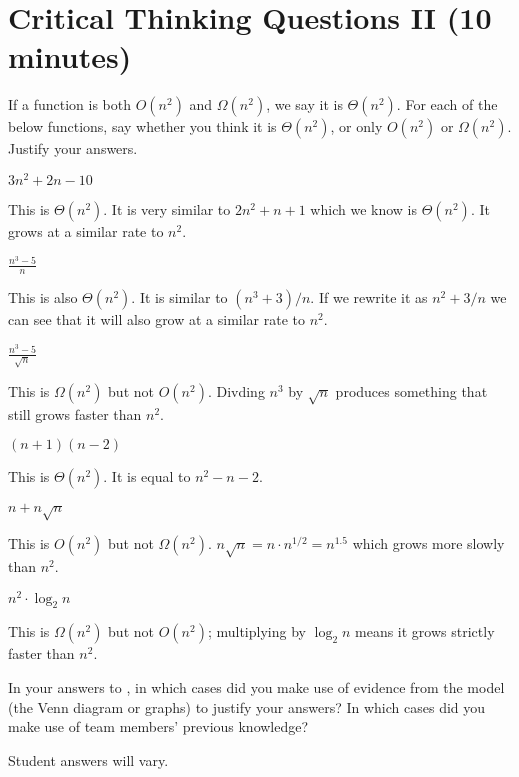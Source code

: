 \documentclass{tufte-handout}
\begin{document}
\section{Critical Thinking Questions II (10 minutes)}

\begin{questions}
\item \label{q:classify} If a function is both $O(n^2)$ and
  $\Omega(n^2)$, we say it is $\Theta(n^2)$.    For each of the below functions, say
  whether you think it is $\Theta(n^2)$, or only $O(n^2)$ or
  $\Omega(n^2)$.  Justify your answers.
  \begin{subquestions}
  \item $3n^2 + 2n - 10$
    \begin{answer}
      This is $\Theta(n^2)$.  It is very similar to $2n^2 + n + 1$ which
      we know is $\Theta(n^2)$.  It grows at a similar rate to $n^2$.
    \end{answer}
  \item $\displaystyle \frac{n^3 - 5}{n}$
    \begin{answer}
      This is also $\Theta(n^2)$.  It is similar to $(n^3 + 3)/n$.  If
      we rewrite it as $n^2 + 3/n$ we can see that it will also grow
      at a similar rate to $n^2$.
    \end{answer}
  \item $\displaystyle \frac{n^3 - 5}{\sqrt n}$
    \begin{answer}
      This is $\Omega(n^2)$ but not $O(n^2)$.  Divding $n^3$ by $\sqrt
      n$ produces something that still grows faster than $n^2$.
    \end{answer}
  \item $(n+1)(n-2)$
    \begin{answer}
      This is $\Theta(n^2)$. It is equal to $n^2 - n - 2$.
    \end{answer}
  \item $n + n \sqrt n$
    \begin{answer}
      This is $O(n^2)$ but not $\Omega(n^2)$.  $n \sqrt n = n \cdot
      n^{1/2} = n^{1.5}$ which grows more slowly than $n^2$.
    \end{answer}
  \item $n^2 \cdot \log_2 n$
    \begin{answer}
      This is $\Omega(n^2)$ but not $O(n^2)$; multiplying by
      $\log_2 n$ means it grows strictly faster than $n^2$.
    \end{answer}
  \end{subquestions}
\item In your answers to , in which cases did you
  make use of evidence from the model (the Venn diagram or graphs) to
  justify your answers?  In which cases did you make use of team
  members' previous knowledge?
  \begin{answer}
    Student answers will vary.
  \end{answer}
\end{questions}
\end{document}

